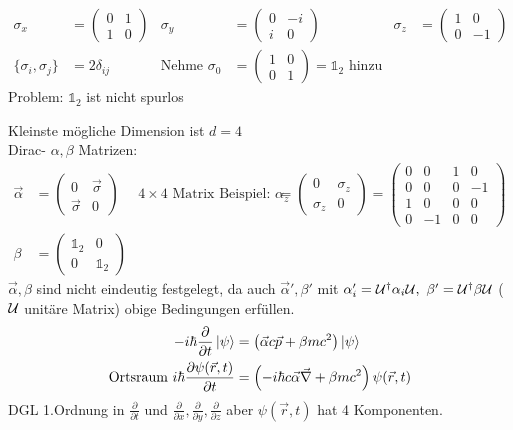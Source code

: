 	\begin{align*}
		\sigma_x &=
		\begin{pmatrix}
		0 & 1 \\
		1 & 0
		\end{pmatrix}&
		\sigma_y &=
		\begin{pmatrix}
		0 & -i \\
		i & 0
		\end{pmatrix}&
		\sigma_z &= 
		\begin{pmatrix}
		1 & 0 \\
		0 & -1
		\end{pmatrix} \\
		\{\sigma_i, \sigma_j\} &= 2 \delta_{ij} 
		&\text{Nehme } \sigma_0 &=
		\begin{pmatrix}
		1 & 0 \\
		0 & 1
		\end{pmatrix}
		= \mathds{1}_2 \text{ hinzu} 
	\end{align*}
Problem: $\mathds{1}_2$ ist nicht spurlos

Kleinste mögliche Dimension ist $d = 4$
\\
Dirac- $\alpha,\beta$ Matrizen:
	\begin{align*}
		\vec{\alpha} &=
		\begin{pmatrix}
		0 & \vec{\sigma} \\
		\vec{\sigma} & 0
		\end{pmatrix} 
		& 4 \times 4 \text{ Matrix Beispiel: }
		\alpha_z &=
		\begin{pmatrix}
		0 & \sigma_z \\
		\sigma_z & 0
		\end{pmatrix}
		=
		\begin{pmatrix}
		0 & 0 & 1 & 0 \\
		0 & 0 & 0 & -1 \\
		1 & 0 & 0 & 0\\
		0 & -1 & 0 & 0
		\end{pmatrix} \\
		\beta &=
		\begin{pmatrix}
		\mathds{1}_2 & 0 \\
		0 & \mathds{1}_2
		\end{pmatrix}
	\end{align*}
$\vec{\alpha}, \beta$ sind nicht eindeutig festgelegt, da auch $\vec{\alpha}', \beta'$ mit 
$\alpha_i' = \mathcal{U}^\dagger \alpha_i \mathcal{U},~ \beta' = \mathcal{U}^\dagger \beta \mathcal{U}$ ($\mathcal{U}$ unitäre Matrix) obige Bedingungen erfüllen.
	\begin{align*}
		-i\hbar \frac{\partial}{\partial t} \ket{\psi}
		&= \left(\vec{\alpha} c \vec{p} + \beta m c^2\right) \ket{\psi} \\
		\text{Ortsraum } i\hbar \frac{\partial \psi (\vec{r}, t)}{\partial t}
		&= \left(-i\hbar c \vec{\alpha} \vec{\nabla} + \beta m c^2\right) \psi (\vec{r}, t)
	\end{align*}
DGL 1.Ordnung in $\frac{\partial}{\partial t}$ und $\frac{\partial}{\partial x}, \frac{\partial}{\partial y}, \frac{\partial}{\partial z}$ aber $\psi (\vec{r}, t)$ hat 4 Komponenten.

